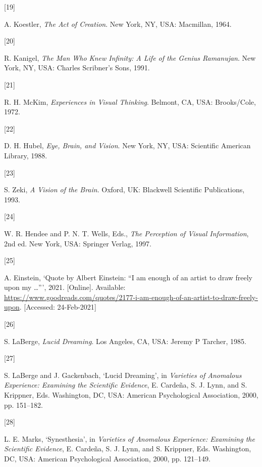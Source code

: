 \documentclass[
  12pt,
  british,
  a4paper,
  rgb,
  dvipsnames,
  svgnames,
  hyphens]{article}
\newlength{\cslhangindent}
\newlength{\csllabelwidth}
\newenvironment{CSLReferences}[2] %
 {%
  \setlength{\parindent}{0pt}
  \ifodd #1 \everypar{\setlength{\hangindent}{\cslhangindent}}\ignorespaces\fi
  \ifnum #2 > 0
  \setlength{\parskip}{#2\baselineskip}
  \fi
 }%
 {}
\newcommand{\CSLLeftMargin}[1]{\parbox[t]{\csllabelwidth}{#1}}
\newcommand{\CSLRightInline}[1]{\parbox[t]{\linewidth - \csllabelwidth}{#1}\break}
\begin{document}
\begin{CSLReferences}{0}{0}
\leavevmode{}%
\CSLLeftMargin{{[}19{]} }
\CSLRightInline{A. Koestler, \emph{{The Act of Creation}}. New York, NY,
USA: Macmillan, 1964. }

\leavevmode{}%
\CSLLeftMargin{{[}20{]} }
\CSLRightInline{R. Kanigel, \emph{{The Man Who Knew Infinity: A Life of
the Genius Ramanujan}}. New York, NY, USA: Charles Scribner's Sons,
1991. }

\leavevmode{}%
\CSLLeftMargin{{[}21{]} }
\CSLRightInline{R. H. McKim, \emph{{Experiences in Visual Thinking}}.
Belmont, CA, USA: Brooks/Cole, 1972. }

\leavevmode{}%
\CSLLeftMargin{{[}22{]} }
\CSLRightInline{D. H. Hubel, \emph{{Eye, Brain, and Vision}}. New York,
NY, USA: Scientific American Library, 1988. }

\leavevmode{}%
\CSLLeftMargin{{[}23{]} }
\CSLRightInline{S. Zeki, \emph{{A Vision of the Brain}}. Oxford, UK:
Blackwell Scientific Publications, 1993. }

\leavevmode{}%
\CSLLeftMargin{{[}24{]} }
\CSLRightInline{W. R. Hendee and P. N. T. Wells, Eds., \emph{{The
Perception of Visual Information}}, 2nd ed. New York, USA: Springer
Verlag, 1997. }

\leavevmode{}%
\CSLLeftMargin{{[}25{]} }
\CSLRightInline{A. Einstein, {`{Quote by Albert Einstein: {``I am enough
of an artist to draw freely upon my \ldots{}''}}'}, 2021. {[}Online{]}.
Available:
\url{https://www.goodreads.com/quotes/2177-i-am-enough-of-an-artist-to-draw-freely-upon}.
{[}Accessed: 24-Feb-2021{]}}

\leavevmode{}%
\CSLLeftMargin{{[}26{]} }
\CSLRightInline{S. LaBerge, \emph{{Lucid Dreaming}}. Los Angeles, CA,
USA: Jeremy P Tarcher, 1985. }

\leavevmode{}%
\CSLLeftMargin{{[}27{]} }
\CSLRightInline{S. LaBerge and J. Gackenbach, {`{Lucid Dreaming}'}, in
\emph{{Varieties of Anomalous Experience: Examining the Scientific
Evidence}}, E. Cardeña, S. J. Lynn, and S. Krippner, Eds. Washington,
DC, USA: American Psychological Association, 2000, pp. 151--182. }

\leavevmode{}%
\CSLLeftMargin{{[}28{]} }
\CSLRightInline{L. E. Marks, {`Synesthesia'}, in \emph{{Varieties of
Anomalous Experience: Examining the Scientific Evidence}}, E. Cardeña,
S. J. Lynn, and S. Krippner, Eds. Washington, DC, USA: American
Psychological Association, 2000, pp. 121--149. }


\end{CSLReferences}
\end{document}
